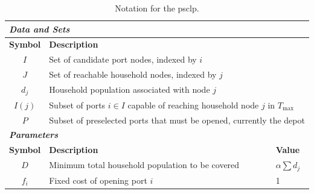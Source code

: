\documentclass[12pt]{article}
\begin{document}
\begin{table}[htbp]
  \centering
  \caption{Notation for the \ac{psclp}.}
  \label{tab:psclp_notation}
  \renewcommand{\arraystretch}{1.3}
  \begin{tabularx}{\textwidth}{c X l}
    \toprule

    \multicolumn{3}{l}{\textbf{\textit{Data and Sets}}}                                                                                                  \\
    \midrule
    \textbf{Symbol} & \textbf{Description}                                                                                                               \\
    \midrule
    \(I\)           & \multicolumn{2}{l}{Set of candidate port nodes, indexed by \(i\)}                                                                  \\
    \(J\)           & \multicolumn{2}{l}{Set of reachable household nodes, indexed by \(j\)}                                                             \\
    \(d_j\)         & \multicolumn{2}{l}{Household population associated with node \(j\)}                                                                \\
    \(I(j)\)        & \multicolumn{2}{l}{Subset of ports \(i \in I\) capable of reaching household node \(j\) in \(T_{\max}\)}                           \\
    \(P\)           & \multicolumn{2}{l}{Subset of preselected ports that must be opened, currently the depot}                                           \\
    \midrule

    \multicolumn{3}{l}{\textbf{\textit{Parameters}}}                                                                                                     \\
    \midrule
    \textbf{Symbol} & \textbf{Description}                                                                                     & \textbf{Value}          \\
    \midrule
    \(D\)           & Minimum total household population to be covered                                                         & \(\alpha \sum d_j\)     \\
    \(f_i\)         & Fixed cost of opening port \(i\)                                                                         & 1                       \\
    \midrule


\end{tabularx}
\end{table}
\end{document}
